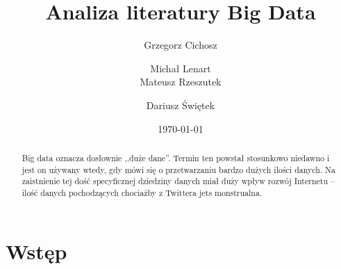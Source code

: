\documentclass[twocolumn]{svjour3}          %
\begin{document}

\title{Analiza literatury Big Data}

\author{Grzegorz Cichosz \and
    Michał Lenart \\
    Mateusz Rzeszutek \and
    Dariusz Świętek
}


\date{\today}

\maketitle

\begin{abstract}
    Big data oznacza dosłownie ,,duże dane''. Termin ten powstał stosunkowo niedawno i jest on używany wtedy, gdy mówi się o przetwarzaniu bardzo dużych ilości danych. Na zaistnienie tej dość specyficznej dziedziny danych miał duży wpływ rozwój Internetu -- ilość danych pochodzących chociażby z Twittera jets monstrualna.
\end{abstract}

\section{Wstęp}
\label{sec:wstep}


\end{document}

